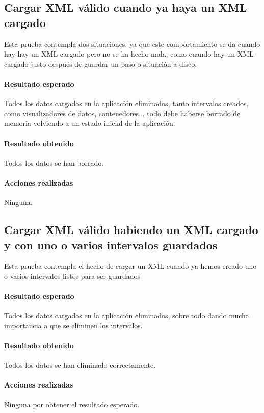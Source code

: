 \subsection{Cargar XML v\'alido cuando ya haya un XML cargado}
Esta prueba contempla dos situaciones, 
ya que este comportamiento se da cuando hay
hay un XML cargado pero no se ha hecho nada, como cuando hay un XML cargado justo
despu\'es de guardar un paso o situaci\'on a disco.

\paragraph{Resultado esperado}
Todos los datos cargados en la aplicaci\'on eliminados, 
tanto intervalos creados, como visualizadores de datos,
contenedores... todo debe haberse borrado de memoria volviendo a un estado inicial
de la aplicaci\'on.

\paragraph{Resultado obtenido}
Todos los datos se han borrado.

\paragraph{Acciones realizadas}
Ninguna.

\subsection{Cargar XML v\'alido habiendo un XML cargado y con uno o varios intervalos guardados}
Esta prueba contempla el hecho de cargar un XML cuando ya hemos creado uno o varios
intervalos listos para ser guardados

\paragraph{Resultado esperado}
Todos los datos cargados en la aplicaci\'on eliminados, sobre todo dando mucha importancia a
que se eliminen los intervalos.

\paragraph{Resultado obtenido}
Todos los datos se han eliminado correctamente.

\paragraph{Acciones realizadas}
Ninguna por obtener el resultado esperado.

